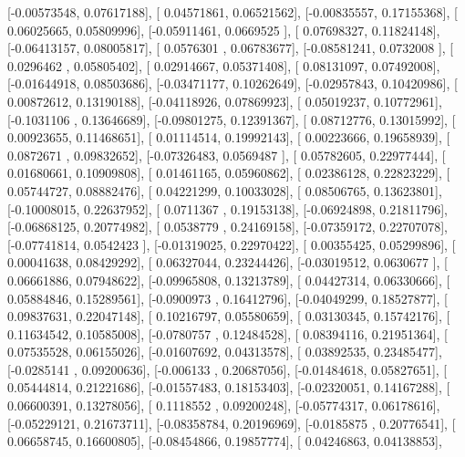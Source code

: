 \documentclass{article}
\begin{document}
       [-0.00573548,  0.07617188],
       [ 0.04571861,  0.06521562],
       [-0.00835557,  0.17155368],
       [ 0.06025665,  0.05809996],
       [-0.05911461,  0.0669525 ],
       [ 0.07698327,  0.11824148],
       [-0.06413157,  0.08005817],
       [ 0.0576301 ,  0.06783677],
       [-0.08581241,  0.0732008 ],
       [ 0.0296462 ,  0.05805402],
       [ 0.02914667,  0.05371408],
       [ 0.08131097,  0.07492008],
       [-0.01644918,  0.08503686],
       [-0.03471177,  0.10262649],
       [-0.02957843,  0.10420986],
       [ 0.00872612,  0.13190188],
       [-0.04118926,  0.07869923],
       [ 0.05019237,  0.10772961],
       [-0.1031106 ,  0.13646689],
       [-0.09801275,  0.12391367],
       [ 0.08712776,  0.13015992],
       [ 0.00923655,  0.11468651],
       [ 0.01114514,  0.19992143],
       [ 0.00223666,  0.19658939],
       [ 0.0872671 ,  0.09832652],
       [-0.07326483,  0.0569487 ],
       [ 0.05782605,  0.22977444],
       [ 0.01680661,  0.10909808],
       [ 0.01461165,  0.05960862],
       [ 0.02386128,  0.22823229],
       [ 0.05744727,  0.08882476],
       [ 0.04221299,  0.10033028],
       [ 0.08506765,  0.13623801],
       [-0.10008015,  0.22637952],
       [ 0.0711367 ,  0.19153138],
       [-0.06924898,  0.21811796],
       [-0.06868125,  0.20774982],
       [ 0.0538779 ,  0.24169158],
       [-0.07359172,  0.22707078],
       [-0.07741814,  0.0542423 ],
       [-0.01319025,  0.22970422],
       [ 0.00355425,  0.05299896],
       [ 0.00041638,  0.08429292],
       [ 0.06327044,  0.23244426],
       [-0.03019512,  0.0630677 ],
       [ 0.06661886,  0.07948622],
       [-0.09965808,  0.13213789],
       [ 0.04427314,  0.06330666],
       [ 0.05884846,  0.15289561],
       [-0.0900973 ,  0.16412796],
       [-0.04049299,  0.18527877],
       [ 0.09837631,  0.22047148],
       [ 0.10216797,  0.05580659],
       [ 0.03130345,  0.15742176],
       [ 0.11634542,  0.10585008],
       [-0.0780757 ,  0.12484528],
       [ 0.08394116,  0.21951364],
       [ 0.07535528,  0.06155026],
       [-0.01607692,  0.04313578],
       [ 0.03892535,  0.23485477],
       [-0.0285141 ,  0.09200636],
       [-0.006133  ,  0.20687056],
       [-0.01484618,  0.05827651],
       [ 0.05444814,  0.21221686],
       [-0.01557483,  0.18153403],
       [-0.02320051,  0.14167288],
       [ 0.06600391,  0.13278056],
       [ 0.1118552 ,  0.09200248],
       [-0.05774317,  0.06178616],
       [-0.05229121,  0.21673711],
       [-0.08358784,  0.20196969],
       [-0.0185875 ,  0.20776541],
       [ 0.06658745,  0.16600805],
       [-0.08454866,  0.19857774],
       [ 0.04246863,  0.04138853],
\end{document}
